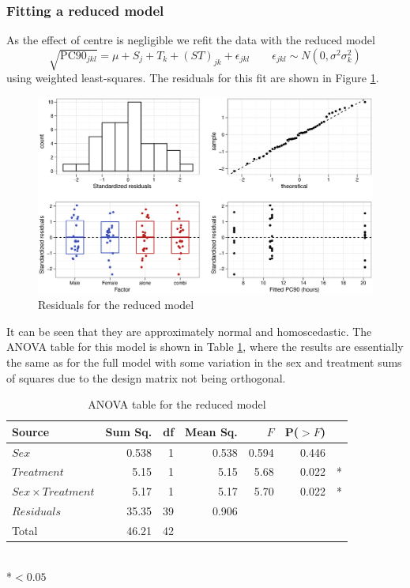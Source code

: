 \subsubsection*{Fitting a reduced model}
As the effect of centre is negligible we refit the data with the reduced model
\begin{equation}
\sqrt{\mathrm{PC}90_{jkl}}=\mu+S_j+T_k+(ST)_{jk}+\epsilon_{jkl}\quad\quad\epsilon_{jkl}\sim N(0,\sigma^{2}\sigma_{k}^2)\label{reduced}
\end{equation}
using weighted least-squares. The residuals for this fit are shown in Figure \ref{aov2rwt}.
\begin{figure}[ht]
\includegraphics[width=150mm]{aov2rwt.eps} 
\caption{Residuals for the reduced model}
\label{aov2rwt}
\end{figure}

It can be seen that they are approximately normal and homoscedastic. The ANOVA table for this model is shown in Table \ref{aovreduced}, where the results are essentially the same as for the full model with some variation in the sex and treatment sums of squares due to the design matrix not being orthogonal.
\begin{table}[h]
\centering
\caption{ANOVA table for the reduced model}\label{aovreduced}
\begin{tabular}{l|rrrrrl}
Source&Sum Sq.&df&Mean Sq.&$F$&P($>F$)\\
\hline
$Sex$				& 0.538 & 1 & 0.538 & 0.594 & 0.446 & \\
$Treatment$			& 5.15   & 1 & 5.15   & 5.68   & 0.022 & *\\
$Sex\times Treatment$	& 5.17   & 1 & 5.17   & 5.70   & 0.022 & *\\
$Residuals$			& 35.35 & 39 & 0.906 &&&\\
\hline
Total&46.21&42&&&
\end{tabular}\\
\hspace{20em}*$<0.05$
\end{table}

